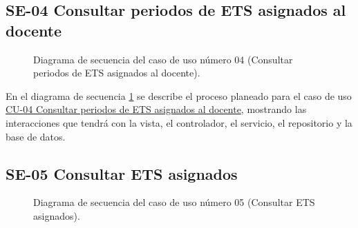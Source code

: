 \newpage

\subsection{SE-04 Consultar periodos de ETS asignados al docente}

\begin{figure}[htbp!]
	\begin{center}
		\caption{Diagrama de secuencia del caso de uso número 04 (Consultar periodos de ETS asignados al docente).}
		\label{fig:Diagrama de secuencia CU-04}
	\end{center}
\end{figure}

En el diagrama de secuencia \ref{fig:Diagrama de secuencia CU-04} se describe el proceso planeado para el caso de uso \hyperlink{CU-04}{CU-04 Consultar periodos de ETS asignados al docente}, mostrando las interacciones que tendrá con la vista, el controlador, el servicio, el repositorio y la base de datos.

\newpage

\subsection{SE-05 Consultar ETS asignados}

\begin{figure}[htbp!]
	\begin{center}
		\caption{Diagrama de secuencia del caso de uso número 05 (Consultar ETS asignados).}
		\label{fig:Diagrama de secuencia CU-05}
	\end{center}
\end{figure}

